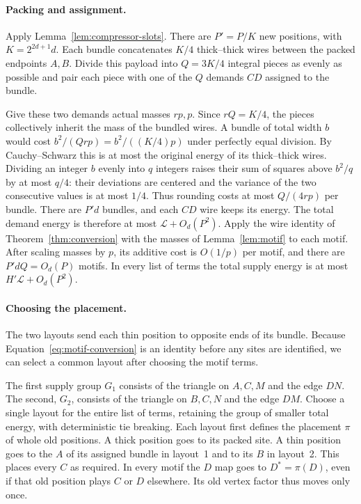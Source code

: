 \paragraph{Packing and assignment.}
Apply Lemma~\ref{lem:compressor-slots}. There are $P'=P/K$ new
positions, with $K=2^{2d+1}d$. Each bundle concatenates $K/4$ thick--thick
wires between the packed endpoints $A,B$. Divide this payload into
$Q=3K/4$ integral pieces as evenly as possible and pair each piece
with one of the $Q$ demands $CD$ assigned to the bundle.

Give these two demands actual masses $rp,p$. Since $rQ=K/4$, the pieces
collectively inherit the mass of the bundled wires. A bundle of total width $b$
would cost $b^2/(Qrp)=b^2/((K/4)p)$ under perfectly equal division. By
Cauchy--Schwarz this is at most the original energy of its thick--thick
wires. Dividing an integer $b$ evenly into $q$ integers raises their sum of
squares above $b^2/q$ by at most $q/4$: their deviations are centered and
the variance of the two consecutive values is at most $1/4$.
Thus rounding costs at most $Q/(4rp)$ per bundle. There are $P'd$ bundles,
and each $CD$ wire keeps its energy. The total demand energy is therefore
at most $\mathcal L+O_d(P^2)$. Apply the wire identity of
Theorem~\ref{thm:conversion} with the masses of Lemma~\ref{lem:motif} to
each motif. After scaling masses by $p$, its additive cost is $O(1/p)$ per motif,
and there are $P'dQ=O_d(P)$ motifs. In every list of terms the total supply
energy is at most $H'\mathcal L+O_d(P^2)$.

\paragraph{Choosing the placement.}
The two layouts send each thin position to opposite ends of its bundle.
Because Equation~\eqref{eq:motif-conversion} is an identity before any
sites are identified, we can select a common layout after choosing the
motif terms.

The first supply group $G_1$ consists of the triangle on $A,C,M$ and the
edge $DN$. The second, $G_2$, consists of the triangle on $B,C,N$ and the
edge $DM$. Choose a single layout for the entire list of terms, retaining the
group of smaller total energy, with deterministic tie breaking. Each layout
first defines the placement $\pi$ of whole old positions. A thick position
goes to its packed site. A thin position goes to the $A$ of its assigned
bundle in layout~1 and to its $B$ in layout~2. This places every $C$ as
required. In every motif the $D$ map goes to $D^*=\pi(D)$, even if that old
position plays $C$ or $D$ elsewhere. Its old vertex factor thus moves only
once.

